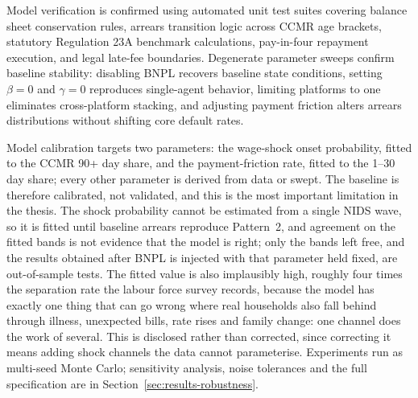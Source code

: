Model verification is confirmed using automated unit test suites covering balance sheet conservation rules, arrears transition logic across \ac{CCMR} age brackets, statutory Regulation 23A benchmark calculations, pay-in-four repayment execution, and legal late-fee boundaries.
Degenerate parameter sweeps confirm baseline stability: disabling \ac{BNPL} recovers baseline state conditions, setting $\beta = 0$ and $\gamma = 0$ reproduces single-agent behavior, limiting platforms to one eliminates cross-platform stacking, and adjusting payment friction alters arrears distributions without shifting core default rates.

\label{sec:lim-calibration}
Model calibration targets two parameters: the wage-shock onset probability, fitted to the \ac{CCMR} 90+ day share, and the payment-friction rate, fitted to the 1--30 day share; every other parameter is derived from data or swept.
The baseline is therefore calibrated, not validated, and this is the most important limitation in the thesis.
The shock probability cannot be estimated from a single \ac{NIDS} wave, so it is fitted until baseline arrears reproduce Pattern~2, and agreement on the fitted bands is not evidence that the model is right; only the bands left free, and the results obtained after \ac{BNPL} is injected with that parameter held fixed, are out-of-sample tests.
The fitted value is also implausibly high, roughly four times the separation rate the labour force survey records, because the model has exactly one thing that can go wrong where real households also fall behind through illness, unexpected bills, rate rises and family change: one channel does the work of several.
This is disclosed rather than corrected, since correcting it means adding shock channels the data cannot parameterise.
Experiments run as multi-seed Monte Carlo; sensitivity analysis, noise tolerances and the full specification are in Section~\ref{sec:results-robustness}.
